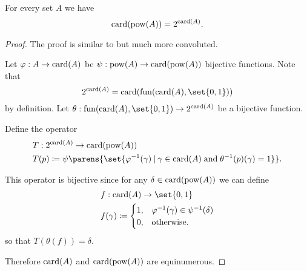\begin{proposition}\label{thm:cardinal_exponentiation_power_set}
  For every set \( A \) we have
  \begin{equation*}
    \operatorname{card}(\operatorname{pow}(A)) = 2^{\operatorname{card}(A)}.
  \end{equation*}
\end{proposition}
\begin{proof}
  The proof is similar to  but much more convoluted.

  Let \( \varphi: A \to \operatorname{card}(A) \) be \( \psi: \operatorname{pow}(A) \to \operatorname{card}(\operatorname{pow}(A)) \) bijective functions. Note that
  \begin{equation*}
    2^{\card(A)} = \card(\fun(\card(A), \set{ 0, 1 }))
  \end{equation*}
  by definition. Let \( \theta: \fun(\card(A), \set{ 0, 1 }) \to 2^{\card(A)} \) be a bijective function.

  Define the operator
  \begin{equation*}
    \begin{aligned}
      &T: 2^{\card(A)} \to \card(\pow(A)) \\
      &T(p) \coloneqq \psi\parens{ \set{ \varphi^{-1}(\gamma) \given \gamma \in \card(A) \T{and} \theta^{-1}(p)(\gamma) = 1 } }.
    \end{aligned}
  \end{equation*}

  This operator is bijective since for any \( \delta \in \operatorname{card}(\operatorname{pow}(A)) \) we can define
  \begin{equation*}
    \begin{aligned}
      &f: \card(A) \to \set{ 0, 1 } \\
      &f(\gamma) \coloneqq \begin{cases}
        1, &\varphi^{-1}(\gamma) \in \psi^{-1}(\delta) \\
        0, &\T{otherwise.}
      \end{cases}
    \end{aligned}
  \end{equation*}
  so that \( T(\theta(f)) = \delta \).

  Therefore \( \operatorname{card}(A) \) and \( \operatorname{card}(\operatorname{pow}(A)) \) are equinumerous.
\end{proof}


